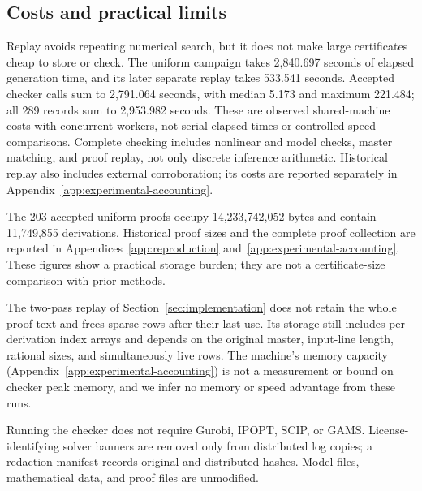 \subsection{Costs and practical limits}
\label{sec:experimental-costs}

Replay avoids repeating numerical search, but it does not make large
certificates cheap to store or check. The uniform campaign takes 2,840.697 seconds of elapsed
generation time, and its later separate replay takes 533.541 seconds. Accepted
checker calls sum to 2,791.064 seconds, with median 5.173 and maximum 221.484;
all 289 records sum to 2,953.982 seconds. These are observed shared-machine
costs with concurrent workers, not serial elapsed times or controlled speed
comparisons. Complete checking includes nonlinear and model checks, master
matching, and proof replay, not only discrete inference arithmetic. Historical
replay also includes external corroboration; its costs are reported
separately in Appendix~\ref{app:experimental-accounting}.

The 203 accepted uniform proofs occupy 14,233,742,052 bytes and contain
11,749,855 derivations. Historical proof sizes and the complete proof
collection are reported in Appendices~\ref{app:reproduction}
and~\ref{app:experimental-accounting}. These figures show a practical storage
burden; they are not a certificate-size comparison with prior methods.

The two-pass replay
of Section~\ref{sec:implementation} does not retain the whole proof text and
frees sparse rows after their last use. Its storage still includes per-derivation index arrays and depends on the
original master, input-line length, rational sizes, and simultaneously live
rows. The machine's memory capacity (Appendix~\ref{app:experimental-accounting})
is not a measurement or bound on checker peak memory, and we infer no memory or
speed advantage from these runs.

Running the checker does not require Gurobi, IPOPT, SCIP, or GAMS. License-identifying
solver banners are removed only from distributed log copies; a redaction
manifest records original and distributed hashes. Model files, mathematical
data, and proof files are unmodified.

